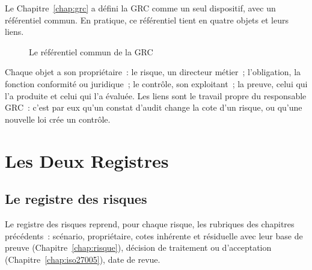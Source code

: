 Le Chapitre~\ref{chap:grc} a défini la GRC comme un seul dispositif, avec
un référentiel commun. En pratique, ce référentiel tient en quatre objets
et leurs liens.

\begin{figure}[H]
\centering
{}
\caption{Le référentiel commun de la GRC}
\label{fig:c13-referentiel}
\end{figure}

Chaque objet a son propriétaire~: le risque, un directeur métier~;
l'obligation, la fonction conformité ou juridique~; le contrôle, son
exploitant~; la preuve, celui qui l'a produite et celui qui l'a évaluée.
Les liens sont le travail propre du responsable GRC~: c'est par eux qu'un
constat d'audit change la cote d'un risque, ou qu'une nouvelle loi crée un
contrôle.

\section{Les Deux Registres}
\label{sec:c13-registres}

\subsection{Le registre des risques}

Le registre des risques reprend, pour chaque risque, les rubriques des
chapitres précédents~: scénario, propriétaire, cotes inhérente et
résiduelle avec leur base de preuve (Chapitre~\ref{chap:risque}), décision
de traitement ou d'acceptation (Chapitre~\ref{chap:iso27005}), date de
revue.

